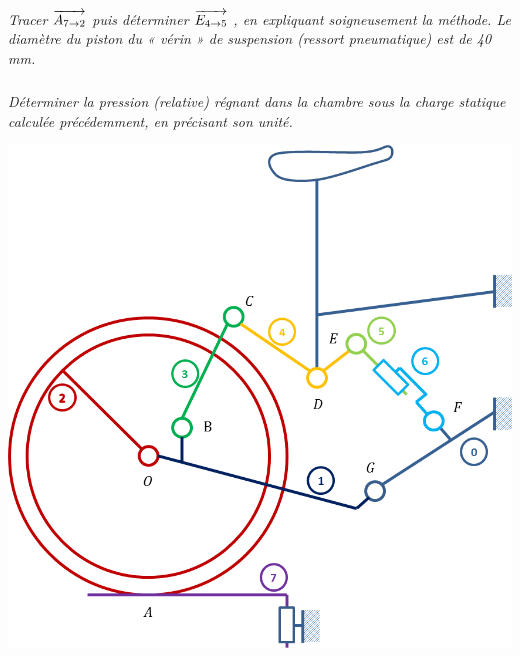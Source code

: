 \documentclass[10pt]{article}
\begin{document}
\subparagraph{}
\textit{Tracer $\overrightarrow{A_{7\rightarrow2}}$ puis déterminer $\overrightarrow{E_{4\rightarrow5}}$ , en expliquant soigneusement la méthode.
Le diamètre du piston du « vérin » de suspension (ressort pneumatique) est de 40 mm.}

\subparagraph{}
\textit{Déterminer la pression (relative) régnant dans la chambre sous la charge statique
calculée précédemment, en précisant son unité.}


\begin{center}
\includegraphics[width=.9\textwidth]{images/vtt3}
\end{center}

\newpage
\end{document}
